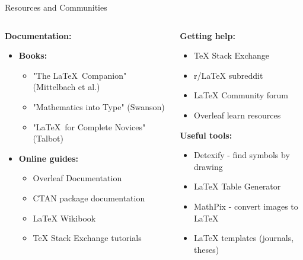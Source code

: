      
     \begin{frame}{Resources and Communities}
          \begin{columns}
               \begin{column}{0.5\textwidth}
                    \textbf{Documentation:}
                    \begin{itemize}
                         \item \textbf{Books:}
                         \begin{itemize}
                              \item "The \LaTeX\ Companion" (Mittelbach et al.)
                              \item "Mathematics into Type" (Swanson)
                              \item "\LaTeX\ for Complete Novices" (Talbot)
                         \end{itemize}
                         
                         \item \textbf{Online guides:}
                         \begin{itemize}
                              \item Overleaf Documentation
                              \item CTAN package documentation
                              \item LaTeX Wikibook
                              \item TeX Stack Exchange tutorials
                         \end{itemize}
                    \end{itemize}
               \end{column}
               
               \begin{column}{0.5\textwidth}
                    \textbf{Getting help:}
                    \begin{itemize}
                         \item TeX Stack Exchange
                         \item r/LaTeX subreddit
                         \item LaTeX Community forum
                         \item Overleaf learn resources
                    \end{itemize}
                    
                    \textbf{Useful tools:}
                    \begin{itemize}
                         \item Detexify - find symbols by drawing
                         \item LaTeX Table Generator
                         \item MathPix - convert images to LaTeX
                         \item LaTeX templates (journals, theses)
                    \end{itemize}
               \end{column}
          \end{columns}
          

\end{frame}
